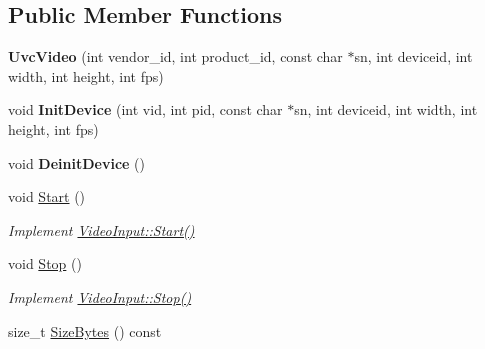 \subsection*{Public Member Functions}
\begin{DoxyCompactItemize}
\item 
{\bfseries Uvc\+Video} (int vendor\+\_\+id, int product\+\_\+id, const char $\ast$sn, int deviceid, int width, int height, int fps)\hypertarget{classpangolin_1_1_uvc_video_a0f46c33139437413d96d121f2a28eb8b}{}\label{classpangolin_1_1_uvc_video_a0f46c33139437413d96d121f2a28eb8b}

\item 
void {\bfseries Init\+Device} (int vid, int pid, const char $\ast$sn, int deviceid, int width, int height, int fps)\hypertarget{classpangolin_1_1_uvc_video_a97581ba667b89d4786a7a793a1923f4a}{}\label{classpangolin_1_1_uvc_video_a97581ba667b89d4786a7a793a1923f4a}

\item 
void {\bfseries Deinit\+Device} ()\hypertarget{classpangolin_1_1_uvc_video_a9faed7f02a253bdfa115e46286808f5a}{}\label{classpangolin_1_1_uvc_video_a9faed7f02a253bdfa115e46286808f5a}

\item 
void \hyperlink{classpangolin_1_1_uvc_video_a34accb4f7d75ea6a105cd8002fb54ec9}{Start} ()\hypertarget{classpangolin_1_1_uvc_video_a34accb4f7d75ea6a105cd8002fb54ec9}{}\label{classpangolin_1_1_uvc_video_a34accb4f7d75ea6a105cd8002fb54ec9}

\begin{DoxyCompactList}\small\item\em Implement \hyperlink{structpangolin_1_1_video_input_a74a2e3e1b87c7cbf9de9bcb39e1df128}{Video\+Input\+::\+Start()} \end{DoxyCompactList}\item 
void \hyperlink{classpangolin_1_1_uvc_video_a4650e9189c1f0ac366bece1a1e1b9ecd}{Stop} ()\hypertarget{classpangolin_1_1_uvc_video_a4650e9189c1f0ac366bece1a1e1b9ecd}{}\label{classpangolin_1_1_uvc_video_a4650e9189c1f0ac366bece1a1e1b9ecd}

\begin{DoxyCompactList}\small\item\em Implement \hyperlink{structpangolin_1_1_video_input_a8945f80194cc7ec9594db7f27e7d09b8}{Video\+Input\+::\+Stop()} \end{DoxyCompactList}\item 
size\+\_\+t \hyperlink{classpangolin_1_1_uvc_video_a49b28d342f5200f2cb343493704359d4}{Size\+Bytes} () const \hypertarget{classpangolin_1_1_uvc_video_a49b28d342f5200f2cb343493704359d4}{}\label{classpangolin_1_1_uvc_video_a49b28d342f5200f2cb343493704359d4}


\end{DoxyCompactItemize}
